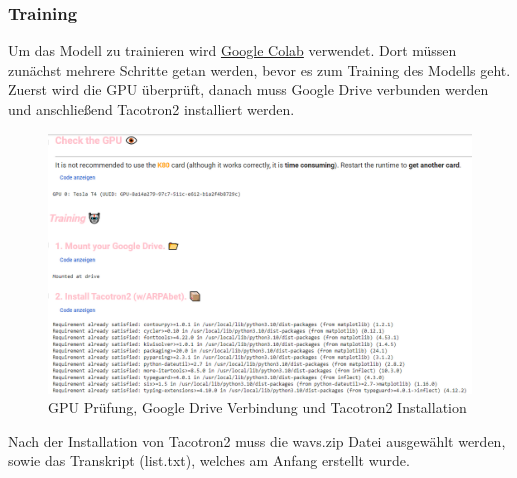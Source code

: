\subsubsection*{Training}
Um das Modell zu trainieren wird \href{https://colab.research.google.com/github/justinjohn0306/FakeYou-Tacotron2-Notebook/blob/dev/FakeYou_Tacotron_2_Training.ipynb}{Google Colab} verwendet. Dort müssen zunächst mehrere Schritte getan werden, bevor es zum Training des Modells geht. Zuerst wird die GPU überprüft, danach muss Google Drive verbunden werden und anschließend Tacotron2 installiert werden.
\begin{figure}[H]
    \includegraphics[width=1.0\textwidth]{Bilder/AudioTraining1}
    \centering
    \caption{GPU Prüfung, Google Drive Verbindung und Tacotron2 Installation}
    \label{fig:TrainingPart1}
\end{figure}
Nach der Installation von Tacotron2 muss die wavs.zip Datei ausgewählt werden, sowie das Transkript (list.txt), welches am Anfang erstellt wurde.
